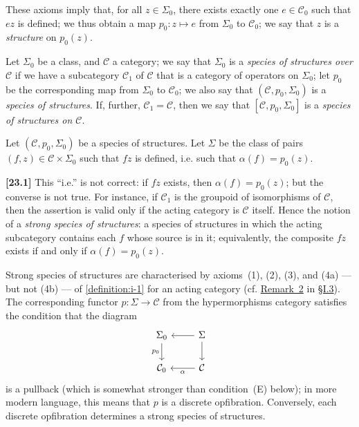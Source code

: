 \documentclass[a4paper,fleqn]{article}
\theoremstyle{plain}
\theoremstyle{definition}
\newenvironment{definition}[1]
  {\renewcommand\theinnerdefinition{#1}\innerdefinition}
  {\endinnerdefinition}
\newenvironment{longcomm}[1]
  {\noindent\textbf{[#1]}\rmfamily}
  {}
\newcommand{\CC}{\mathcal{C}}
\begin{document}
These axioms imply that, for all $z\in\Sigma_0$, there exists exactly one $e\in\CC_0$ such that $ez$ is defined;
we thus obtain a map $p_0\colon z\mapsto e$ from $\Sigma_0$ to $\CC_0$;
we say that $z$ is a \emph{structure} on $p_0(z)$.

\begin{definition}{2}
\label{definition:i-2}
  Let $\Sigma_0$ be a class, and $\CC$ a category;
  we say that $\Sigma_0$ is a \emph{species of structures over $\CC$} if we have a subcategory $\CC_1$ of $\CC$ that is a category of operators on $\Sigma_0$;
  let $p_0$ be the corresponding map from $\Sigma_0$ to $\CC_0$;
  we also say that $(\CC,p_0,\Sigma_0)$ is a \emph{species of structures}.
  If, further, $\CC_1=\CC$, then we say that $[\CC,p_0,\Sigma_0]$ is a \emph{species of structures on $\CC$}.
\end{definition}

Let $(\CC,p_0,\Sigma_0)$ be a species of structures.
Let $\Sigma$ be the class of pairs $(f,z)\in\CC\times\Sigma_0$ such that $fz$ is defined, i.e. such that $\alpha(f)=p_0(z)$.

\begin{longcomm}{23.1}
  This ``i.e.'' is not correct: if $fz$ exists, then $\alpha(f)=p_0(z)$;
  but the converse is not true.
  For instance, if $\CC_1$ is the groupoid of isomorphisms of $\CC$, then the assertion is valid only if the acting category is $\CC$ itself.
  Hence the notion of a \emph{strong species of structures}: a species of structures in which the acting subcategory contains each $f$ whose source is in it;
  equivalently, the composite $fz$ exists if and only if $\alpha(f)=p_0(z)$.

  Strong species of structures are characterised by axioms~(1), (2), (3), and (4a) --- but not (4b) --- of \cref{definition:i-1} for an acting category (cf. \hyperref[remark:i-2]{Remark~2} in \hyperref[section:i.3]{§I.3}).
  The corresponding functor $p\colon\Sigma\to\CC$ from the hypermorphisms category satisfies the condition that the diagram
  \[
    \begin{tikzcd}
      \Sigma_0
        \ar[d,swap,"p_0"]
      & \Sigma
        \ar[l]
        \ar[d]
    \\\CC_0
      & \CC
        \ar[l,"\alpha"]
    \end{tikzcd}
  \]
  is a pullback (which is somewhat stronger than condition~(E) below);
  in more modern language, this means that $p$ is a discrete opfibration.
  Conversely, each discrete opfibration determines a strong species of structures.
\end{longcomm}
\end{document}
